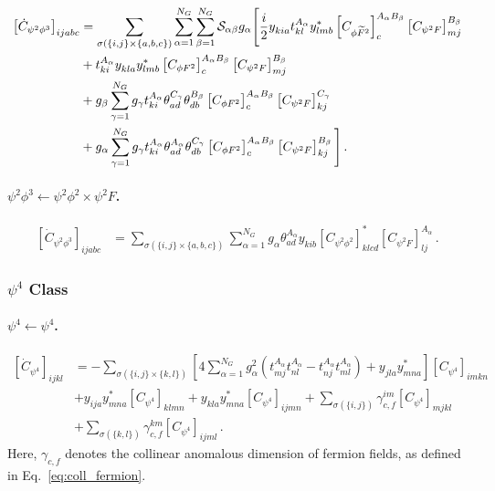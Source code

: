\begin{align}
    \left[\dot C_{\psi^2\phi^3}\right]_{ijabc} &= \sum_{\sigma(\{i,j\}\times\{a,b,c\})} \sum_{\alpha=1}^{N_G}\sum_{\beta=1}^{N_G} \mathcal{S}_{\alpha\beta} g_\alpha\Bigg[\frac{i}{2} y_{kia}^{\phantom *} t_{kl}^{A_\alpha} y_{lmb}^* \left[C_{\phi \tildee F^2}\right]_{c}^{A_\alpha B_\beta}\left[C_{\psi^2 F}\right]_{mj}^{B_\beta}\nonumber\\
    &+ t_{ki}^{A_\alpha} y_{kla}^{\phantom *} y_{lmb}^* \left[C_{\phi F^2}\right]_{c}^{A_\alpha B_\beta}\left[C_{\psi^2 F}\right]_{mj}^{B_\beta}\nonumber\\
    &+g_\beta\sum_{\gamma=1}^{N_G} g_\gamma t_{ki}^{A_\alpha}\theta_{ad}^{C_\gamma}\theta_{db}^{B_\beta}\left[C_{\phi F^2}\right]_c^{A_\alpha B_\beta} \left[C_{\psi^2 F}\right]_{kj}^{C_\gamma}\nonumber\\
    &+g_\alpha\sum_{\gamma=1}^{N_G} g_\gamma t_{ki}^{A_\alpha}\theta_{ad}^{A_\alpha}\theta_{db}^{C_\gamma}\left[C_{\phi F^2}\right]_c^{A_\alpha B_\beta} \left[C_{\psi^2 F}\right]_{kj}^{B_\beta}\Bigg]\,.
\end{align}

\paragraph{$\psi^2\phi^3 \leftarrow \psi^2\phi^2 \times \psi^2 F$.}

\begin{align}
    \left[\dot C_{\psi^2\phi^3}\right]_{ijabc} &= \sum_{\sigma(\{i,j\}\times\{a,b,c\})} \sum_{\alpha=1}^{N_G} g_\alpha \theta_{ad}^{A_\alpha} y_{kib} \left[C_{\psi^2\phi^2}\right]_{klcd}^* \left[C_{\psi^2 F}\right]_{lj}^{A_\alpha}\,.
\end{align}

\subsubsection{\texorpdfstring{$\psi^4$}{psi4} Class}

\paragraph{\texorpdfstring{$\psi^4 \leftarrow \psi^4$}{psi4frompsi4}.}

\begin{align}
    \left[\dot C_{\psi^4}\right]_{ijkl} &= 
    -\sum_{\sigma(\{i,j\} \times \{k,l\})} 
    \left[ 4 \sum_{\alpha=1}^{N_G} g_\alpha^2 \left(t^{A_\alpha}_{mj}t^{A_\alpha}_{nl} - t^{A_\alpha}_{nj}t^{A_\alpha}_{ml} \right)  + y_{jla}y^*_{mna}  \right] \left[C_{\psi^4}\right]_{imkn}\nonumber \\
    &
    + y_{ija}y^*_{mna}  \left[C_{\psi^4}\right]_{klmn}
    + y_{kla}y^*_{mna}  \left[C_{\psi^4}\right]_{ijmn}
    + \sum_{\sigma(\{i,j\})} \gamma_{c,f}^{im}\left[C_{\psi^4}\right]_{mjkl}\nonumber \\
    & + \sum_{\sigma(\{k,l\})} \gamma_{c,f}^{km}\left[C_{\psi^4}\right]_{ijml}\,.
\end{align}
Here, $\gamma_{c,f}$ denotes the collinear anomalous dimension of fermion fields, as defined in Eq.~\eqref{eq:coll_fermion}.

